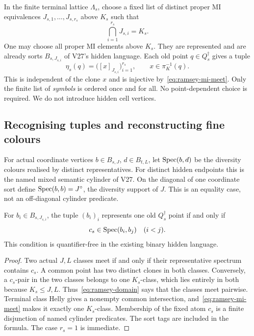 In the finite terminal lattice $\Lambda_s$, choose a fixed list of distinct
proper MI equivalences $J_{s,1},\ldots,J_{s,r_s}$ above $K_s$ such that
\begin{equation}\label{eq:ramsey-mi-meet}
                  \bigcap_{i=1}^{r_s}J_{s,i}=K_s.
\end{equation}
One may choose all proper MI elements above $K_s$. They are represented and
are already sorts $B_{s,J_{s,i}}$ of V27's hidden language. Each old point
$q\in Q_s^\dagger$ gives a tuple
\[
       \eta_s(q)=\bigl([x]_{J_{s,i}}\bigr)_{i=1}^{r_s},
       \qquad x\in\pi_K^{-1}(q).
\]
This is independent of the clone $x$ and is injective by~\eqref{eq:ramsey-mi-meet}.
Only the finite list of \emph{symbols} is ordered once and for all. No
point-dependent choice is required. We do not introduce hidden cell vertices.

\subsection{Recognising tuples and reconstructing fine colours}

For actual coordinate vertices $b\in B_{s,J}$, $d\in B_{t,L}$, let
$\operatorname{Spec}(b,d)$ be the diversity colours realised by distinct representatives.
For distinct hidden endpoints this is the named mixed semantic cylinder of
V27. On the diagonal of one coordinate sort define
$\operatorname{Spec}(b,b)=J^\circ$, the diversity support of $J$. This is an equality case,
not an off-diagonal cylinder predicate.

\begin{lemma}\label{lem:ramsey-mi-domain}
For $b_i\in B_{s,J_{s,i}}$, the tuple $(b_i)_i$ represents one old
$Q_s^\dagger$ point if and only if
\begin{equation}\label{eq:ramsey-domain}
                 c_s\in\operatorname{Spec}(b_i,b_j)\quad(i<j).
\end{equation}
This condition is quantifier-free in the existing binary hidden language.
\end{lemma}
\begin{proof}
Two actual $J,L$ classes meet if and only if their representative spectrum
contains $c_s$. A common point has two distinct clones in both classes.
Conversely, a $c_s$-pair in the two classes belongs to one $K_s$-class, which
lies entirely in both because $K_s\le J,L$. Thus~\eqref{eq:ramsey-domain} says that
the classes meet pairwise. Terminal class Helly gives a nonempty common
intersection, and~\eqref{eq:ramsey-mi-meet} makes it exactly one $K_s$-class. Membership
of the fixed atom $c_s$ is a finite disjunction of named cylinder predicates.
The sort tags are included in the formula. The case $r_s=1$ is immediate.
\end{proof}


